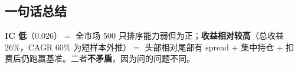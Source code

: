 \documentclass[UTF8,a4paper,12pt]{ctexart}
\begin{document}
\subsection{一句话总结}

\textbf{IC 低}（0.026）$=$ 全市场 500 只排序能力弱但为正；\textbf{收益相对较高}（总收益 26\%，CAGR 60\% 为短样本外推）$=$ 头部相对尾部有 spread + 集中持仓 + 扣费后仍跑赢基准。\;二者\textbf{不矛盾}，因为问的问题不同。
\end{document}
